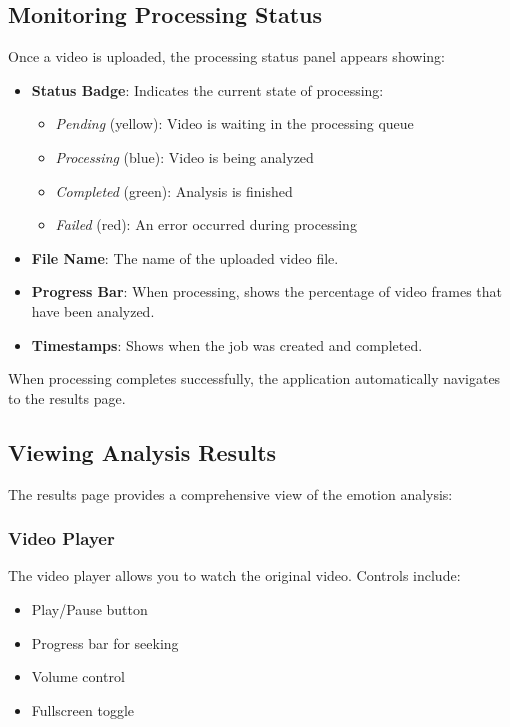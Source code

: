 \subsection{Monitoring Processing Status}

Once a video is uploaded, the processing status panel appears showing:

\begin{itemize}
    \item \textbf{Status Badge}: Indicates the current state of processing:
    \begin{itemize}
        \item \textit{Pending} (yellow): Video is waiting in the processing queue
        \item \textit{Processing} (blue): Video is being analyzed
        \item \textit{Completed} (green): Analysis is finished
        \item \textit{Failed} (red): An error occurred during processing
    \end{itemize}

    \item \textbf{File Name}: The name of the uploaded video file.

    \item \textbf{Progress Bar}: When processing, shows the percentage of video frames that have been analyzed.

    \item \textbf{Timestamps}: Shows when the job was created and completed.
\end{itemize}

When processing completes successfully, the application automatically navigates to the results page.

\subsection{Viewing Analysis Results}

The results page provides a comprehensive view of the emotion analysis:

\subsubsection{Video Player}

The video player allows you to watch the original video. Controls include:
\begin{itemize}
    \item Play/Pause button
    \item Progress bar for seeking
    \item Volume control
    \item Fullscreen toggle
\end{itemize}

